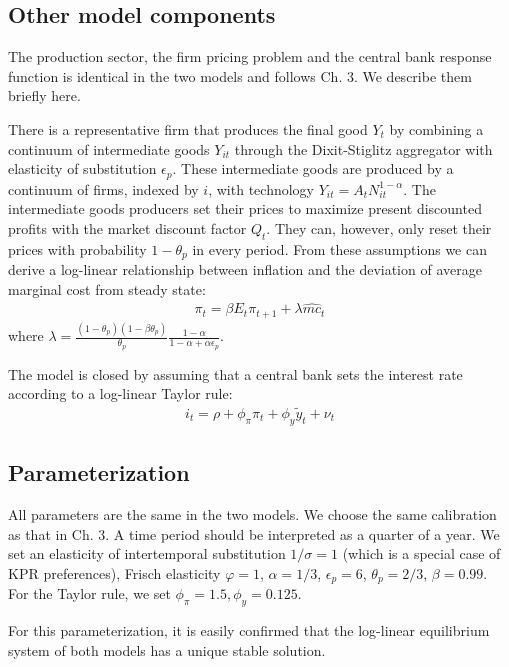 \subsection{Other model components}
The production sector, the firm pricing problem and the central bank response function is identical in the two models and follows \citet{Gali1999} Ch. 3. We describe them briefly here. 

There is a representative firm that produces the final good $Y_t$ by combining a continuum of intermediate goods $Y_{it}$ through the Dixit-Stiglitz aggregator with elasticity of substitution $\epsilon_p$. These intermediate goods are produced by a continuum of firms, indexed by $i$, with technology $Y_{it}=A_t N_{it}^{1-\alpha}$. The intermediate goods producers set their prices to maximize present discounted profits with the market discount factor $Q_t$. They can, however, only reset their prices with probability $1-\theta_p$ in every period. From these assumptions we can derive a log-linear relationship between inflation and the deviation of average marginal cost from steady state:
\begin{eqnarray}
\pi_t = \beta E_t \pi_{t+1}+\lambda \hat{mc}_t
\end{eqnarray}  
where $\lambda = \frac{(1-\theta_p)(1-\beta \theta_p)}{\theta_p} \frac{1-\alpha}{1-\alpha+\alpha \epsilon_p}$. 

The model is closed by assuming that a central bank sets the interest rate according to a log-linear Taylor rule:
\begin{eqnarray}
i_t = \rho + \phi_{\pi}\pi_t + \phi_{y}\tilde y_t +\nu_t
\end{eqnarray}

\subsection{Parameterization}
All parameters are the same in the two models. We choose the same calibration as that in \citet{Gali2009} Ch. 3. A time period should be interpreted as a quarter of a year. We set an elasticity of intertemporal substitution $1/\sigma=1$ (which is a special case of KPR preferences), Frisch elasticity $\varphi=1$, $\alpha=1/3$, $\epsilon_p=6$, $\theta_p=2/3$, $\beta=0.99$. For the Taylor rule, we set $\phi_{\pi}=1.5,\phi_{y}=0.125$. 

For this parameterization, it is easily confirmed that the log-linear equilibrium system of both models has a unique stable solution. 

